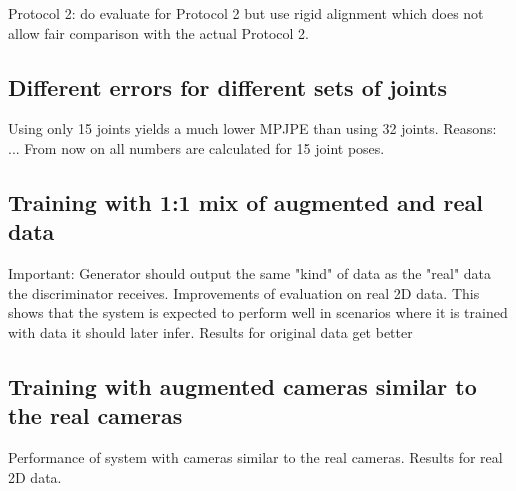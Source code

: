 Protocol 2: \citet{drover18} do evaluate for Protocol 2 but use rigid alignment which does not allow fair comparison with the actual Protocol 2.


\subsection{Different errors for different sets of joints}
Using only 15 joints yields a much lower MPJPE than using 32 joints. Reasons: ...	
From now on all numbers are calculated for 15 joint poses.

\subsection{Training with 1:1 mix of augmented and real data}
Important: Generator should output the same "kind" of data as the "real" data the discriminator receives.
Improvements of evaluation on real 2D data. 
This shows that the system is expected to perform well in scenarios where it is trained with data it should later infer.
Results for original data get better


\subsection{Training with augmented cameras similar to the real cameras}
Performance of system with cameras similar to the real cameras.
Results for real 2D data.